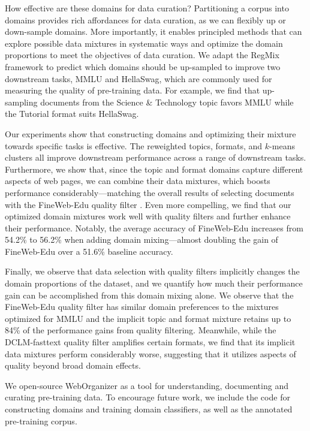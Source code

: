 How effective are these domains for data curation?
Partitioning a corpus into domains provides rich affordances for data curation, as we can flexibly up or down-sample domains.
More importantly, it enables principled methods that can explore possible data mixtures in systematic ways and optimize the domain proportions to meet the objectives of data curation.
We adapt the RegMix framework \citep{liu2024regmix} to predict which domains should be up-sampled to improve two downstream tasks, MMLU and HellaSwag, which are commonly used for measuring the quality of pre-training data. 
For example, we find that up-sampling documents from the {\atopic Science \& Technology} topic favors MMLU while the {\aformat Tutorial} format suits HellaSwag.


Our experiments show that constructing domains and optimizing their mixture towards specific tasks is effective.
The reweighted topics, formats, and $k$-means clusters all improve downstream performance across a range of downstream tasks.
Furthermore, we show that, since the topic and format domains capture different aspects of web pages, we can combine their data mixtures, which boosts performance considerably---matching the overall results of selecting documents with the FineWeb-Edu quality filter \citep{penedo2024finewebdatasetsdecantingweb}.
Even more compelling, we find that our optimized domain mixtures work well with quality filters and further enhance their performance.
Notably, the average accuracy of FineWeb-Edu increases from 54.2\% to 56.2\% when adding domain mixing---almost doubling the gain of FineWeb-Edu over a 51.6\% baseline accuracy.

Finally, we observe that data selection with quality filters implicitly changes the domain proportions of the dataset, and we quantify how much their performance gain can be accomplished from this domain mixing alone.
We observe that the FineWeb-Edu quality filter has similar domain preferences to the mixtures optimized for MMLU
and the implicit topic and format mixture retains up to 84\% of the performance gains from quality filtering.
Meanwhile, while the DCLM-fasttext quality filter \citep{li2024datacomplm} amplifies certain formats, we find that its implicit data mixtures perform considerably worse, suggesting that it utilizes aspects of quality beyond broad domain effects.



    

We open-source WebOrganizer as a tool for understanding, documenting and curating pre-training data.
To encourage future work, we include the code for constructing domains and training domain classifiers, as well as the annotated pre-training corpus.
